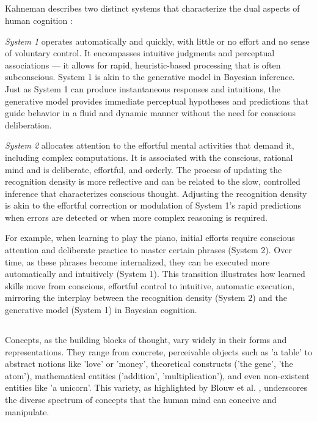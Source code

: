 \subsection{}
Kahneman describes two distinct systems that characterize the dual aspects of human cognition \cite{Kahneman11}:

\emph{System 1} operates automatically and quickly, with little or no effort and no sense of voluntary control. It encompasses intuitive judgments and perceptual associations — it allows for rapid, heuristic-based processing that is often subconscious.
System 1 is akin to the generative model in Bayesian inference. Just as System 1 can produce instantaneous responses and intuitions, the generative model provides immediate perceptual hypotheses and predictions that guide behavior in a fluid and dynamic manner without the need for conscious deliberation.

\emph{System 2} allocates attention to the effortful mental activities that demand it, including complex computations. It is associated with the conscious, rational mind and is deliberate, effortful, and orderly. 
The process of updating the recognition density is more reflective and can be related to the slow, controlled inference that characterizes conscious thought. Adjusting the recognition density is akin to the effortful correction or modulation of System 1's rapid predictions when errors are detected or when more complex reasoning is required.

For example, when learning to play the piano, initial efforts require conscious attention and deliberate practice to master certain phrases (System 2). Over time, as these phrases become internalized, they can be executed more automatically and intuitively (System 1). This transition illustrates how learned skills move from conscious, effortful control to intuitive, automatic execution, mirroring the interplay between the recognition density (System 2) and the generative model (System 1) in Bayesian cognition.


\subsection{}
Concepts, as the building blocks of thought, vary widely in their forms and representations. They range from concrete, perceivable objects such as 'a table' to abstract notions like 'love' or 'money', theoretical constructs ('the gene', 'the atom'), mathematical entities ('addition', 'multiplication'), and even non-existent entities like 'a unicorn'. This variety, as highlighted by Blouw et al. \cite{blouw2016concepts}, underscores the diverse spectrum of concepts that the human mind can conceive and manipulate.

